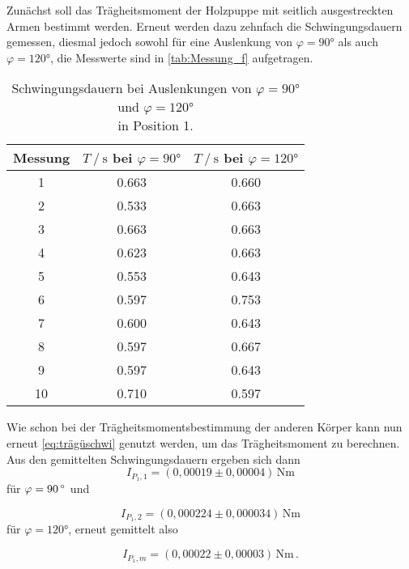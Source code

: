 Zunächst soll das Trägheitsmoment der Holzpuppe mit seitlich ausgestreckten Armen bestimmt werden.
Erneut werden dazu zehnfach die Schwingungsdauern gemessen, diesmal jedoch sowohl für eine Auslenkung von $\varphi = 90 \unit{\degree}$ als auch $\varphi = 120 \unit{\degree}$,
die Messwerte sind in \autoref{tab:Messung_f} aufgetragen.

\begin{table}[H]
  \centering
  \begin{tabular}{S[table-format=2.0] S[table-format=1.3] S}
      \toprule
      {Messung} & {$T \mathbin{/} \unit{\second}$ bei $\varphi = 90 \unit{\degree}$} & {$T \mathbin{/} \unit{\second}$ bei $\varphi = 120 \unit{\degree}$}\\
       & 0.663 & 0.660 \\
      2 & 0.533 & 0.663 \\
      3 & 0.663 & 0.663 \\
      4 & 0.623 & 0.663 \\
      5 & 0.553 & 0.643 \\
      6 & 0.597 & 0.753 \\
      7 & 0.600 & 0.643 \\
      8 & 0.597 & 0.667 \\
      9 & 0.597 & 0.643 \\
      10& 0.710 & 0.597 \\
      \bottomrule
  \end{tabular}
  \caption{Schwingungsdauern bei Auslenkungen von $\varphi = 90 \unit{\degree}$ und $\varphi = 120 \unit{\degree}$ \\ in Position 1.}
  \label{tab:Messung_f}
\end{table}

Wie schon bei der Trägheitsmomentsbestimmung der anderen Körper kann nun erneut \eqref{eq:trägüschwi} genutzt werden, um das Trägheitsmoment zu berechnen.
Aus den gemittelten Schwingungsdauern ergeben sich dann
\begin{equation*}
  I_{P_1,1} = (0,00019 \pm 0,00004) \, \unit{\newton\meter} 
\end{equation*} 
für $\varphi = 90 \, \unit{{\degree}}$ und

\begin{equation*}
  I_{P_1,2} = (0,000224 \pm 0,000034) \, \unit{\newton\meter} 
\end{equation*}
für $\varphi = 120 \unit{\degree}$, erneut gemittelt also

\begin{equation*}
  I_{P_1,m} = (0,00022 \pm 0,00003) \, \unit{\newton\meter} \,.
\end{equation*}

